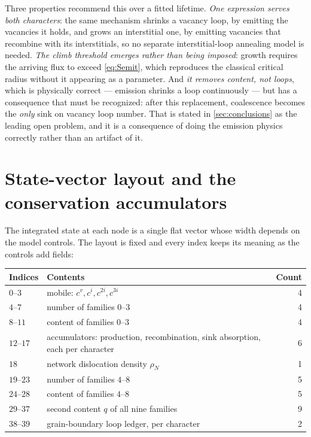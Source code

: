 Three properties recommend this over a fitted lifetime. \emph{One expression
serves both characters}: the same mechanism shrinks a vacancy loop, by emitting
the vacancies it holds, and grows an interstitial one, by emitting vacancies that
recombine with its interstitials, so no separate interstitial-loop annealing
model is needed. \emph{The climb threshold emerges rather than being imposed}:
growth requires the arriving flux to exceed \cref{eq:Semit}, which reproduces the
classical critical radius without it appearing as a parameter. And \emph{it
removes content, not loops}, which is physically correct --- emission shrinks a
loop continuously --- but has a consequence that must be recognized: after this
replacement, coalescence becomes the \emph{only} sink on vacancy loop number.
That is stated in \cref{sec:conclusions} as the leading open problem, and it is a
consequence of doing the emission physics correctly rather than an artifact of
it.

\section{State-vector layout and the conservation accumulators}
\label{app:state}

The integrated state at each node is a single flat vector whose width depends on
the model controls. The layout is fixed and every index keeps its meaning as the
controls add fields:

\begin{center}\small
\begin{tabular}{@{}llr@{}}
\toprule
Indices & Contents & Count \\
\midrule
$0$--$3$   & mobile: $c^{v},c^{i},c^{2i},c^{3i}$ & 4 \\
$4$--$7$   & number of families $0$--$3$ & 4 \\
$8$--$11$  & content of families $0$--$3$ & 4 \\
$12$--$17$ & accumulators: production, recombination, sink absorption,
             each per character & 6 \\
$18$       & network dislocation density $\rho_N$ & 1 \\
$19$--$23$ & number of families $4$--$8$ & 5 \\
$24$--$28$ & content of families $4$--$8$ & 5 \\
$29$--$37$ & second content $q$ of all nine families & 9 \\
$38$--$39$ & grain-boundary loop ledger, per character & 2 \\
\bottomrule
\end{tabular}
\end{center}

